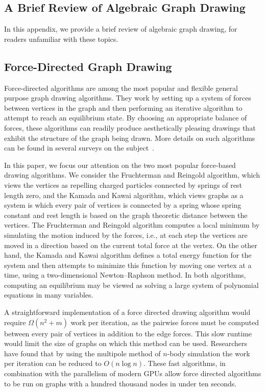 \documentclass[oribibl,10pt]{llncs}
\begin{document}
{\raggedright
\ifFull

\else

\fi
}

\clearpage
\begin{appendix}
\section{A Brief Review of Algebraic Graph Drawing}
\label{app:gd}
In this appendix, we provide a brief review of algebraic graph drawing, for
readers unfamiliar with these topics.

\subsection{Force-Directed Graph Drawing}
Force-directed algorithms are among the most popular and flexible general purpose graph drawing algorithms. They work by setting up a system of forces between vertices in the graph and then performing an iterative algorithm to attempt to reach an equilibrium state. By choosing an appropriate balance of forces, these algorithms can readily produce aesthetically pleasing drawings that exhibit the structure of the graph being drawn. More details on such algorithms can be found in several surveys on the subject~.

In this paper, we focus our attention on the two most popular force-based drawing algorithms. We consider the Fruchterman and Reingold algorithm, which views the vertices as repelling charged particles connected by springs of rest length zero, and the Kamada and Kawai algorithm, which views graphs as a system is which every pair of vertices is connected by a spring whose spring constant and rest length is based on the graph theoretic distance between the vertices. The Fruchterman and Reingold algorithm computes a local minimum by simulating the motion induced by the forces, i.e., at each step the vertices are moved in a direction based on the current total force at the vertex. On the other hand, the Kamada and Kawai algorithm defines a total energy function for the system and then attempts to minimize this function by moving one vertex at a time, using a two-dimensional Newton--Raphson method. In both algorithms, computing an equilibrium may be viewed as solving a large system of polynomial equations in many variables.~\cite{FruRei-SPE-1991,KamKaw-IPL-1989}

A straightforward implementation of a force directed drawing algorithm would require $\Omega(n^2+m)$ work per iteration, as the pairwise forces must be computed between every pair of vertices in addition to the edge forces. This slow runtime would limit the size of graphs on which this method can be used. Researchers have found that by using the multipole method of $n$-body simulation  the work per iteration can be reduced to $O(n\log n)$. These fast algorithms, in combination with the parallelism of modern GPUs  allow force directed algorithms to be run on graphs with a hundred thousand nodes in under ten seconds.


\end{appendix}
\end{document}
